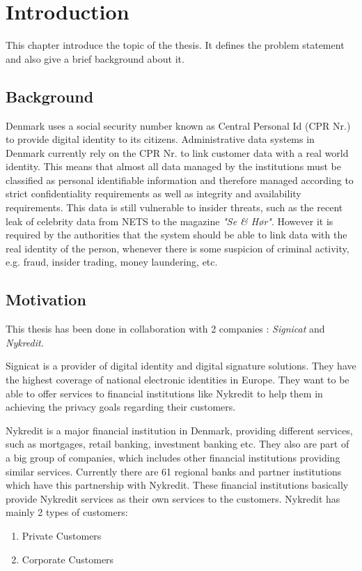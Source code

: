 \chapter{Introduction}

This chapter introduce the topic of the thesis. It defines the problem statement and also give a brief background about it.
\section{Background}
Denmark uses a social security number known as Central Personal Id (CPR Nr.) to provide digital identity to its citizens. Administrative data systems in Denmark currently rely on the CPR Nr. to link customer data with a real world identity. This means that almost all data managed by the institutions must be classified as personal identifiable information and therefore managed according to strict confidentiality requirements as well as integrity and availability requirements. This data is still vulnerable to insider threats, such as the recent leak of celebrity data from NETS to the magazine \textit{"Se \& Hør"}. However it is required by the authorities that the system should be able to link data with the real identity of the person, whenever there is some suspicion of criminal activity, e.g. fraud, insider trading, money laundering, etc.
\section{Motivation}
This thesis has been done in collaboration with 2 companies : \textit{Signicat} and \textit{Nykredit}.

Signicat is a provider of digital identity and digital signature solutions. They have the highest coverage of national electronic identities in Europe. They want to be able to offer services to financial institutions like Nykredit to help them in achieving the privacy goals regarding their customers.

Nykredit is a major financial institution in Denmark, providing different services, such as mortgages, retail banking, investment banking etc. They also are part of a big group of companies, which includes other financial institutions providing similar services. Currently there are 61 regional banks and partner institutions which have this partnership with Nykredit. These financial institutions basically provide Nykredit services as their own services to the customers.
Nykredit has mainly 2 types of customers:
\begin{enumerate}
\item Private Customers
\item Corporate Customers
\end{enumerate}
